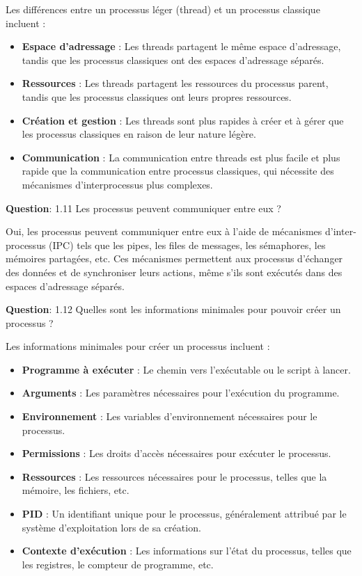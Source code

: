 \noindent Les différences entre un processus léger (thread) et un processus classique incluent :
\begin{itemize}
	\item \textbf{Espace d'adressage} : Les threads partagent le même espace d'adressage, tandis que les processus classiques ont des espaces d'adressage séparés.
	\item \textbf{Ressources} : Les threads partagent les ressources du processus parent, tandis que les processus classiques ont leurs propres ressources.
	\item \textbf{Création et gestion} : Les threads sont plus rapides à créer et à gérer que les processus classiques en raison de leur nature légère.
	\item \textbf{Communication} : La communication entre threads est plus facile et plus rapide que la communication entre processus classiques, qui nécessite des mécanismes d'interprocessus plus complexes.
\end{itemize}

\vspace{0.5cm}

\noindent \textbf{Question}: 1.11 Les processus peuvent communiquer entre eux ?

\noindent Oui, les processus peuvent communiquer entre eux à l'aide de mécanismes d'inter-processus (IPC) tels que les pipes, les files de messages, les sémaphores, les mémoires partagées, etc. Ces mécanismes permettent aux processus d'échanger des données et de synchroniser leurs actions, même s'ils sont exécutés dans des espaces d'adressage séparés.

\vspace{0.5cm}

\noindent \textbf{Question}: 1.12 Quelles sont les informations minimales pour pouvoir créer un processus ?

\noindent Les informations minimales pour créer un processus incluent :
\begin{itemize}
	\item \textbf{Programme à exécuter} : Le chemin vers l'exécutable ou le script à lancer.
	\item \textbf{Arguments} : Les paramètres nécessaires pour l'exécution du programme.
	\item \textbf{Environnement} : Les variables d'environnement nécessaires pour le processus.
	\item \textbf{Permissions} : Les droits d'accès nécessaires pour exécuter le processus.
	\item \textbf{Ressources} : Les ressources nécessaires pour le processus, telles que la mémoire, les fichiers, etc.
	\item \textbf{PID} : Un identifiant unique pour le processus, généralement attribué par le système d'exploitation lors de sa création.
	\item \textbf{Contexte d'exécution} : Les informations sur l'état du processus, telles que les registres, le compteur de programme, etc.
\end{itemize}

